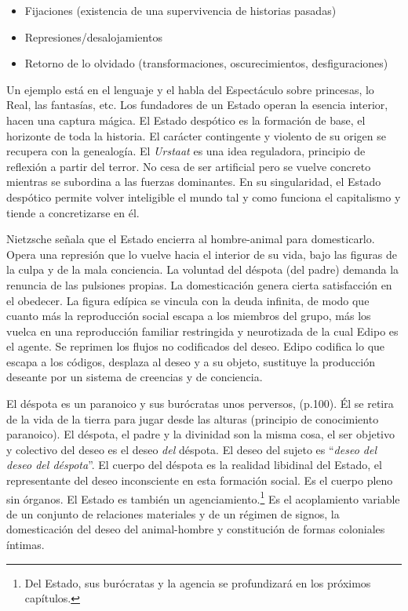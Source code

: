 \begin{itemize}
  \item Fijaciones (existencia de una supervivencia de historias pasadas)
  \item Represiones/desalojamientos
  \item Retorno de lo olvidado (transformaciones, oscurecimientos, desfiguraciones)
\end{itemize}

Un ejemplo está en el lenguaje y el habla del Espectáculo sobre princesas, lo Real, las fantasías, etc. Los fundadores de un Estado operan la esencia interior, hacen una captura mágica. El Estado despótico es la formación de base, el horizonte de toda la historia. El carácter contingente y violento de su origen se recupera con la genealogía. El \emph{Urstaat} es una idea reguladora, principio de reflexión a partir del terror. No cesa de ser artificial pero se vuelve concreto mientras se subordina a las fuerzas dominantes. En su singularidad, el Estado despótico permite volver inteligible el mundo tal y como funciona el capitalismo y tiende a concretizarse en él.

Nietzsche señala que el Estado encierra al hombre-animal para domesticarlo. Opera una represión que lo vuelve hacia el interior de su vida, bajo las figuras de la culpa y de la mala conciencia. La voluntad del déspota (del padre) demanda la renuncia de las pulsiones propias. La domesticación genera cierta satisfacción en el obedecer. La figura edípica se vincula con la deuda infinita, de modo que cuanto más la reproducción social escapa a los miembros del grupo, más los vuelca en una reproducción familiar restringida y neurotizada de la cual Edipo es el agente. Se reprimen los flujos no codificados del deseo. Edipo codifica lo que escapa a los códigos, desplaza al deseo y a su objeto, sustituye la producción deseante por un sistema de creencias y de conciencia.

El déspota es un paranoico y sus burócratas unos perversos, (p.100)\autocite{tiqqunIntroduccionGuerraCivil2008}. Él se retira de la vida de la tierra para jugar desde las alturas (principio de conocimiento paranoico). El déspota, el padre y la divinidad son la misma cosa, el ser objetivo y colectivo del deseo es el deseo \emph{del} déspota. El deseo del sujeto es \enquote{\emph{deseo del deseo del déspota}}. El cuerpo del déspota es la realidad libidinal del Estado, el representante del deseo inconsciente en esta formación social. Es el cuerpo pleno sin órganos. El Estado es también un agenciamiento.\footnote{Del Estado, sus burócratas y la agencia se profundizará en los próximos capítulos.} Es el acoplamiento variable de un conjunto de relaciones materiales y de un régimen de signos, la domesticación del deseo del animal-hombre y constitución de formas coloniales íntimas.

